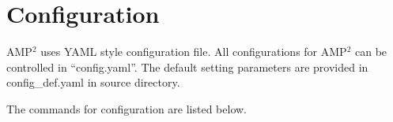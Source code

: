 \documentclass[letterpaper,10pt,english]{sphinxmanual}
\begin{document}
\begin{quote}
\begin{sphinxVerbatim}[commandchars=\\\{\}]
                           
     
     
\end{sphinxVerbatim}
\end{quote}


\section{Configuration}
\label{\detokenize{Input/Configuration:configuration}}\label{\detokenize{Input/Configuration::doc}}
AMP$^{\text{2}}$ uses YAML style configuration file. All configurations for AMP$^{\text{2}}$ can
be controlled in “config.yaml”. The default setting parameters are provided
in config\_def.yaml in source directory.

The commands for configuration are listed below.
\end{document}
